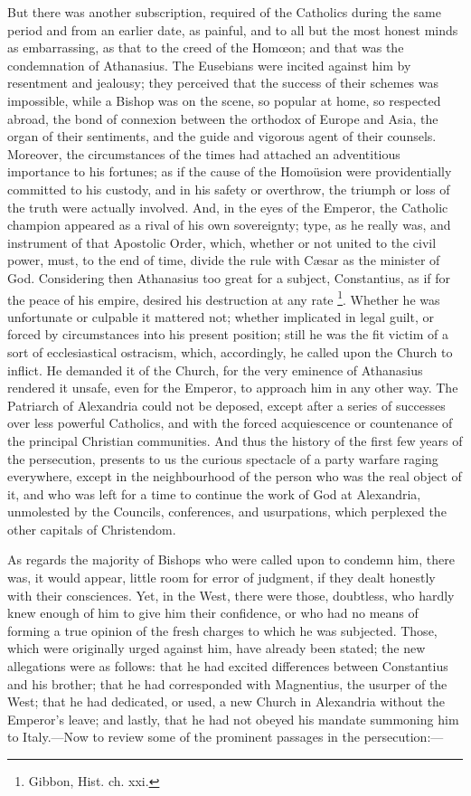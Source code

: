 But there was another subscription, required of the Catholics
during the same period and from an earlier date, as painful, and to
all but the most honest minds as embarrassing, as that to the creed of
the Homœon; and that was the condemnation of Athanasius. The
Eusebians were incited against him by resentment and jealousy; they
perceived that the success of their schemes was impossible, while a
Bishop was on the scene, so popular at home, so respected abroad, the
bond of connexion between the orthodox of Europe and Asia, the organ
of their sentiments, and the guide and vigorous agent of their
counsels. Moreover, the circumstances of the times had attached an
adventitious importance to his fortunes; as if the cause of the Homoüsion
were providentially committed to his custody, and in his safety or
overthrow, the triumph or loss of the truth were actually involved.
And, in the eyes of the Emperor, the Catholic champion appeared as a
rival of his own sovereignty; type, as he really was, and instrument
of that Apostolic Order, which, whether or not united to the civil
power, must, to the end of time, divide the rule with Cæsar as
the minister of God. Considering then Athanasius too great for a
subject, Constantius, as if for the peace of his empire, desired his
destruction at any rate \footnote{Gibbon, Hist. ch. xxi.}.
Whether he was unfortunate or culpable it mattered not; whether
implicated in legal guilt, or forced by circumstances into his present
position; still he was the fit victim of a sort of ecclesiastical
ostracism, which, accordingly, he called upon the Church to inflict.
He demanded it of the Church, for the very eminence of Athanasius
rendered it unsafe, even for the Emperor, to approach him in any other
way. The Patriarch of Alexandria could not be deposed, except after a
series of successes over less powerful Catholics, and with the forced
acquiescence or countenance of the principal Christian communities.
And thus the history of the first few years of the persecution,
presents to us the curious spectacle of a party warfare raging
everywhere, except in the neighbourhood of the person who was the real
object of it, and who was left for a time to continue the work of God
at Alexandria, unmolested by the Councils, conferences, and
usurpations, which perplexed the other capitals of Christendom.

As regards the majority of Bishops who were called upon to condemn
him, there was, it would appear, little room for error of judgment, if
they dealt honestly with their consciences. Yet, in the West, there
were those, doubtless, who hardly knew enough of him to give him their
confidence, or who had no means of forming a true opinion of the fresh
charges to which he was subjected. Those, which were originally urged against him, have already been stated; the new allegations were
as follows: that he had excited differences between Constantius and
his brother; that he had corresponded with Magnentius, the usurper of
the West; that he had dedicated, or used, a new Church in Alexandria
without the Emperor's leave; and lastly, that he had not obeyed his
mandate summoning him to Italy.—Now to review some of the prominent
passages in the persecution:—

